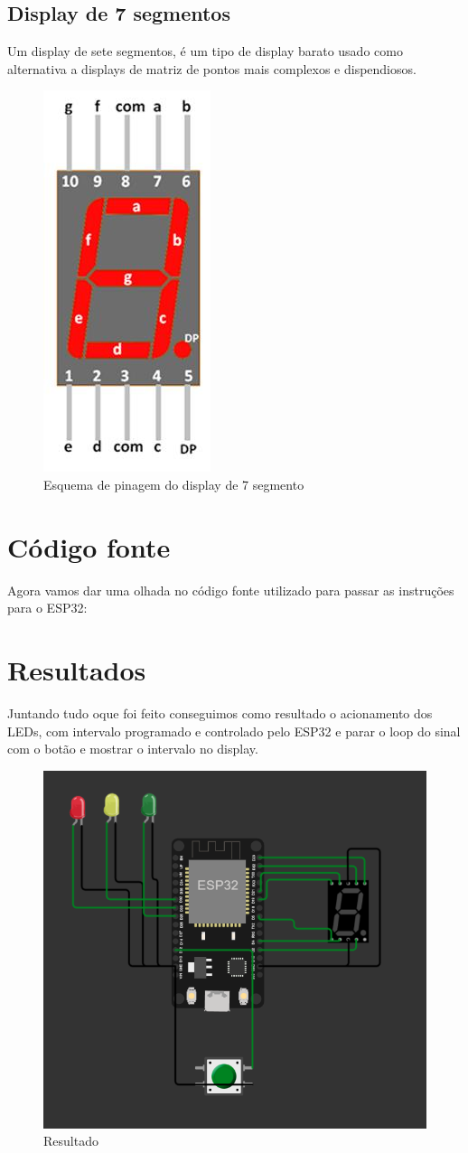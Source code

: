 \documentclass[12pt]{article}
\begin{document}
\subsection{Display de 7 segmentos}
Um display de sete segmentos, é um tipo de display barato usado como alternativa a displays de matriz de pontos mais complexos e dispendiosos.
\begin{figure}[ht]
  \centering
  \includegraphics[width=.25\textwidth]{Images/esquema-de-pinagem-do-display-7-segmentos.jpg}
  \caption{Esquema de pinagem do display de 7 segmento}
  \label{fig:display7seg}
\end{figure}

\section{Código fonte}
Agora vamos dar uma olhada no código fonte utilizado para passar as instruções para o ESP32:



\section{Resultados}
Juntando tudo oque foi feito conseguimos como resultado o acionamento dos LEDs, com intervalo programado e controlado pelo ESP32 e parar o loop do sinal com o botão e mostrar o intervalo no display.
\begin{figure}[ht]
  \centering
  \includegraphics[width=.55\textwidth]{Images/Captura de tela 2022-10-25 102743.png}
  \caption{Resultado}
  \label{fig:exampleLedPiscando}
\end{figure}



\nocite{SANDROJUCA}
\end{document}
